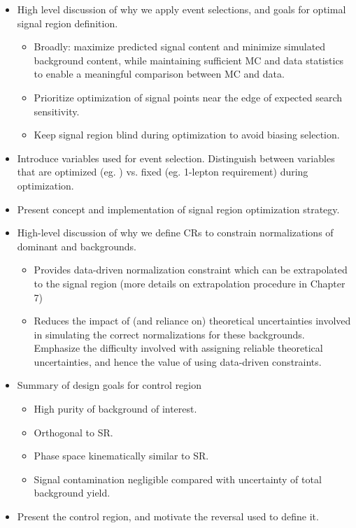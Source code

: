 \begin{itemize}
\item High level discussion of why we apply event selections, and goals for optimal signal region definition.
\begin{itemize}
\item Broadly: maximize predicted signal content and minimize simulated background content, while maintaining sufficient MC and data statistics to enable a meaningful comparison between MC and data.
\item Prioritize optimization of signal points near the edge of expected search sensitivity. 
\item Keep signal region blind during optimization to avoid biasing selection.
\end{itemize}
\item Introduce variables used for event selection. Distinguish between variables that are optimized (eg. \mtlepmet) vs. fixed (eg. 1-lepton requirement) during optimization.
\item Present concept and implementation of signal region optimization strategy.
\item High-level discussion of why we define CRs to constrain normalizations of dominant \wjets and \ttbar backgrounds.
\begin{itemize}
\item Provides data-driven normalization constraint which can be extrapolated to the signal region (more details on extrapolation procedure in Chapter 7)
\item Reduces the impact of (and reliance on) theoretical uncertainties involved in simulating the correct normalizations for these backgrounds. Emphasize the difficulty involved with assigning reliable theoretical uncertainties, and hence the value of using data-driven constraints.
\end{itemize}
\item Summary of design goals for control region
\begin{itemize}
\item High purity of background of interest.
\item Orthogonal to SR.
\item Phase space kinematically similar to SR.
\item Signal contamination negligible compared with uncertainty of total background yield.
\end{itemize}
\item Present the \wjets control region, and motivate the \dR reversal used to define it.

\end{itemize}
